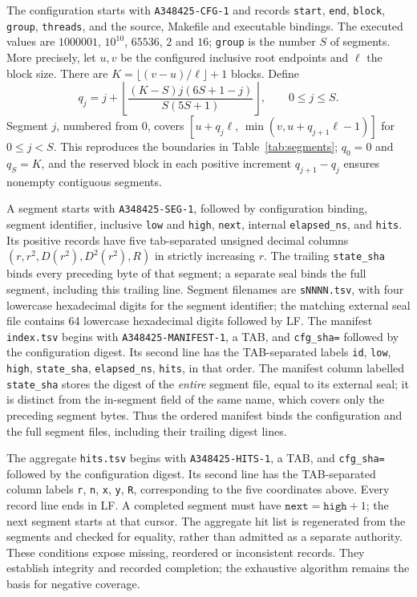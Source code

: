 \documentclass[11pt]{article}
\theoremstyle{definition}
\theoremstyle{remark}
\begin{document}
The configuration starts with \texttt{A348425-CFG-1} and records
\texttt{start}, \texttt{end}, \texttt{block}, \texttt{group},
\texttt{threads}, and the source, Makefile and executable bindings.
The executed values are $1000001$, $10^{10}$, $65536$, $2$ and $16$;
\texttt{group} is the number $S$ of segments. More precisely, let
$u,v$ be the configured inclusive root endpoints and $\ell$ the block size.
There are $K=\lfloor(v-u)/\ell\rfloor+1$ blocks. Define
\[
 q_j=j+\left\lfloor\frac{(K-S)j(6S+1-j)}{S(5S+1)}\right\rfloor,
 \qquad 0\leq j\leq S.
\]
Segment $j$, numbered from $0$, covers
$[u+q_j\ell,\,\min(v,u+q_{j+1}\ell-1)]$ for $0\leq j<S$.
This reproduces the boundaries in Table~\ref{tab:segments}; $q_0=0$
and $q_S=K$, and the reserved block in each positive increment
$q_{j+1}-q_j$ ensures nonempty contiguous segments.

A segment starts with \texttt{A348425-SEG-1}, followed by configuration
binding, segment identifier, inclusive \texttt{low} and \texttt{high},
\texttt{next}, internal \texttt{elapsed\_ns}, and \texttt{hits}.
Its positive records have five tab-separated unsigned decimal columns
$(r,r^{2},D(r^{2}),D^{2}(r^{2}),R)$ in strictly increasing $r$.
The trailing \texttt{state\_sha} binds every preceding byte of that segment;
a separate seal binds the full segment, including this trailing line.
Segment filenames are \texttt{sNNNN.tsv}, with four lowercase
hexadecimal digits for the segment identifier; the matching external seal
file contains 64 lowercase hexadecimal digits followed
by LF. The manifest \texttt{index.tsv} begins with
\texttt{A348425-MANIFEST-1}, a TAB, and \texttt{cfg\_sha=} followed by
the configuration digest. Its second line has the TAB-separated labels
\texttt{id}, \texttt{low}, \texttt{high}, \texttt{state\_sha},
\texttt{elapsed\_ns}, \texttt{hits}, in that order.
The manifest column labelled \texttt{state\_sha} stores the digest of
the \emph{entire} segment file, equal to its external seal; it is distinct
from the in-segment field of the same name, which covers only the preceding
segment bytes. Thus the ordered manifest binds the configuration and the
full segment files, including their trailing digest lines.

The aggregate \texttt{hits.tsv} begins with \texttt{A348425-HITS-1},
a TAB, and \texttt{cfg\_sha=} followed by the configuration digest.
Its second line has the TAB-separated column labels \texttt{r},
\texttt{n}, \texttt{x}, \texttt{y}, \texttt{R}, corresponding to the
five coordinates above. Every record line ends in LF.
A completed segment must have $\texttt{next}=\texttt{high}+1$; the next
segment starts at that cursor. The aggregate hit list is regenerated
from the segments and checked for equality, rather than admitted as a
separate authority. These conditions expose missing, reordered or
inconsistent records. They establish integrity and recorded completion;
the exhaustive algorithm remains the basis for negative coverage.
\end{document}
